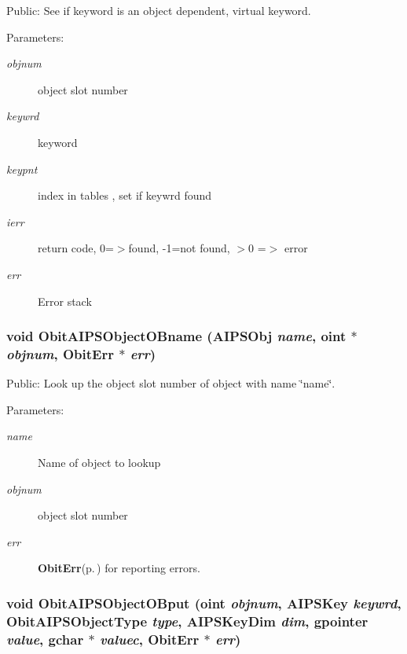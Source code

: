 Public: See if keyword is an object dependent, virtual keyword. 

\begin{Desc}
\item[Parameters:]
\begin{description}
\item[{\em objnum}]object slot number \item[{\em keywrd}]keyword \item[{\em keypnt}]index in tables , set if keywrd found \item[{\em ierr}]return code, 0=$>$found, -1=not found, $>$0 =$>$ error \item[{\em err}]Error stack \end{description}
\end{Desc}
\subsubsection{\setlength{\rightskip}{0pt plus 5cm}void Obit\-AIPSObject\-OBname ({\bf AIPSObj} {\em name}, {\bf oint} $\ast$ {\em objnum}, {\bf Obit\-Err} $\ast$ {\em err})}\label{ObitAIPSObject_8h_a16}


Public: Look up the object slot number of object with name \char`\"{}name\char`\"{}. 

\begin{Desc}
\item[Parameters:]
\begin{description}
\item[{\em name}]Name of object to lookup \item[{\em objnum}]object slot number \item[{\em err}]{\bf Obit\-Err}{\rm (p.\,\pageref{structObitErr})} for reporting errors. \end{description}
\end{Desc}
\subsubsection{\setlength{\rightskip}{0pt plus 5cm}void Obit\-AIPSObject\-OBput ({\bf oint} {\em objnum}, {\bf AIPSKey} {\em keywrd}, Obit\-AIPSObject\-Type {\em type}, {\bf AIPSKey\-Dim} {\em dim}, gpointer {\em value}, gchar $\ast$ {\em valuec}, {\bf Obit\-Err} $\ast$ {\em err})}\label{ObitAIPSObject_8h_a18}


